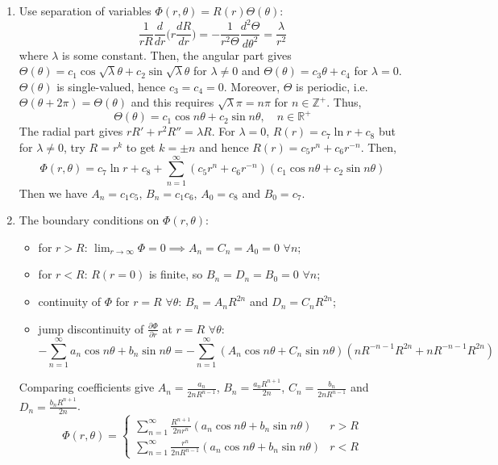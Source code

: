 \documentclass[a4paper]{article}
\begin{document}
\begin{ans}\leavevmode
\begin{enumerate}[label=(\alph*)]
\item Use separation of variables $\Phi(r,\theta)=R(r)\Theta(\theta)$:
$$\frac{1}{rR}\frac{d}{dr}\bigg(r\frac{dR}{dr}\bigg)=-\frac{1}{r^2\Theta}\frac{d^2\Theta}{d\theta^2}=\frac{\lambda}{r^2}$$
where $\lambda$ is some constant. Then, the angular part gives $\Theta(\theta)=c_1\cos\sqrt{\lambda}\theta+c_2\sin\sqrt{\lambda}\theta$ for $\lambda\neq 0$ and $\Theta(\theta)=c_3\theta+c_4$ for $\lambda=0$. $\Theta(\theta)$ is single-valued, hence $c_3=c_4=0$. Moreover, $\Theta$ is periodic, i.e. $\Theta(\theta+2\pi)=\Theta(\theta)$ and this requires $\sqrt{\lambda}\pi=n\pi$ for $n\in\mathbb{Z}^+$. Thus, $$\Theta(\theta)=c_1\cos n\theta+c_2\sin n\theta,\quad n\in\mathbb{R}^+$$
The radial part gives $rR'+r^2R''=\lambda R$. For $\lambda=0$, $R(r)=c_7\ln r+c_8$ but for $\lambda\neq 0$, try $R=r^k$ to get $k=\pm n$ and hence $R(r)=c_5r^n+c_6r^{-n}$. Then,
$$\Phi(r,\theta)=c_7\ln r+c_8+\sum_{n=1}^\infty(c_5r^n+c_6r^{-n})(c_1\cos n\theta+c_2\sin n\theta)$$
Then we have $A_n=c_1c_5$, $B_n=c_1c_6$, $A_0=c_8$ and $B_0=c_7$.
\newpage
\item The boundary conditions on $\Phi(r,\theta)$:
\begin{itemize}
    \item  for $r>R$: $\lim_{r\rightarrow\infty}\Phi=0\implies A_n=C_n=A_0=0$ $\forall n$;
    \item for $r<R$: $R(r=0)$ is finite, so $B_n=D_n=B_0=0$ $\forall n$;
    \item continuity of $\Phi$ for $r=R$ $\forall\theta$: $B_n=A_nR^{2n}$ and $D_n=C_nR^{2n}$;
    \item jump discontinuity of $\frac{\partial\Phi}{\partial r}$ at $r=R$ $\forall\theta$:
    $$-\sum_{n=1}^\infty a_n\cos n\theta+b_n\sin n\theta=-\sum_{n=1}^\infty(A_n\cos n\theta+C_n\sin n\theta)(nR^{-n-1}R^{2n}+nR^{-n-1}R^{2n})$$
\end{itemize}
Comparing coefficients give $A_n=\frac{a_n}{2nR^{n-1}}$, $B_n=\frac{a_nR^{n+1}}{2n}$,  $C_n=\frac{b_n}{2nR^{n-1}}$ and $D_n=\frac{b_nR^{n+1}}{2n}$.
$$\Phi(r,\theta)=
\left\{
        \begin{array}{ll}
      \sum_{n=1}^\infty\frac{R^{n+1}}{2nr^n}(a_n\cos n\theta+b_n\sin n\theta) & r>R \\
      \sum_{n=1}^\infty\frac{r^n}{2nR^{n-1}}(a_n\cos n\theta+b_n\sin n\theta) & r<R
        \end{array}
    \right.$$
\end{enumerate}
\end{ans}
\end{document}
